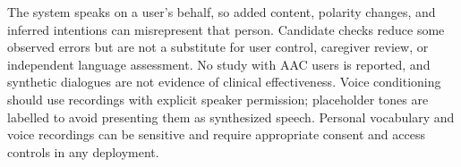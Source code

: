The system speaks on a user's behalf, so added content, polarity changes, and inferred intentions can misrepresent that person.
Candidate checks reduce some observed errors but are not a substitute for user control, caregiver review, or independent language assessment.
No study with AAC users is reported, and synthetic dialogues are not evidence of clinical effectiveness.
Voice conditioning should use recordings with explicit speaker permission; placeholder tones are labelled to avoid presenting them as synthesized speech.
Personal vocabulary and voice recordings can be sensitive and require appropriate consent and access controls in any deployment.
